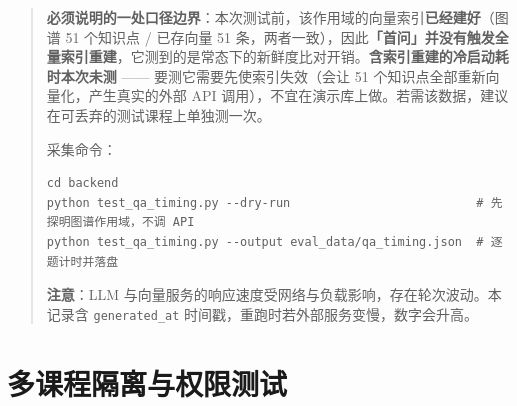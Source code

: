 \documentclass[UTF8,a4paper,11pt]{ctexrep}
\begin{document}
\begin{quote}
\textbf{必须说明的一处口径边界}：本次测试前，该作用域的向量索引\textbf{已经建好}（图谱 51 个知识点 / 已存向量 51 条，两者一致），因此\textbf{「首问」并没有触发全量索引重建}，它测到的是常态下的新鲜度比对开销。\textbf{含索引重建的冷启动耗时本次未测} —— 要测它需要先使索引失效（会让 51 个知识点全部重新向量化，产生真实的外部 API 调用），不宜在演示库上做。若需该数据，建议在可丢弃的测试课程上单独测一次。

采集命令：

\begin{Verbatim}[breaklines=true,breakanywhere=true,fontsize=\small,frame=single,framesep=4pt,rulecolor=\color{codeframe}]
cd backend
python test_qa_timing.py --dry-run                          # 先探明图谱作用域，不调 API
python test_qa_timing.py --output eval_data/qa_timing.json  # 逐题计时并落盘
\end{Verbatim}

\textbf{注意}：LLM 与向量服务的响应速度受网络与负载影响，存在轮次波动。本记录含 \texttt{generated\_at} 时间戳，重跑时若外部服务变慢，数字会升高。

\end{quote}


\section{多课程隔离与权限测试}
\end{document}
